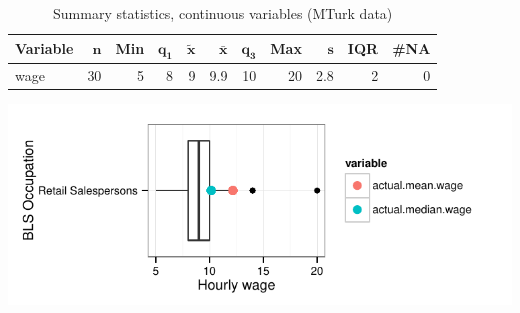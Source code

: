 \documentclass[a4paper,10pt]{article}\usepackage[]{graphicx}\usepackage[]{color}
\makeatletter
\def\maxwidth{ %
  \ifdim\Gin@nat@width>\linewidth
    \linewidth
  \else
    \Gin@nat@width
  \fi
}
\makeatother
\begin{document}
\begin{table}[ht]
\centering
{\footnotesize
\begin{tabular}{lrrrrrrrrrr}
 \textbf{Variable} & $\mathbf{n}$ & \textbf{Min} & $\mathbf{q_1}$ & $\mathbf{\widetilde{x}}$ & $\mathbf{\bar{x}}$ & $\mathbf{q_3}$ & \textbf{Max} & $\mathbf{s}$ & \textbf{IQR} & \textbf{\#NA} \\ 
  \hline
wage & 30 & 5 & 8 & 9 & 9.9 & 10 & 20 & 2.8 & 2 & 0 \\ 
  \end{tabular}
}
\caption{Summary statistics, continuous variables (MTurk data)} 
\label{tab2:41-2030}
\end{table}


{\centering \includegraphics[width=\maxwidth]{figure/unnamed-chunk-21} 

}
\end{document}
